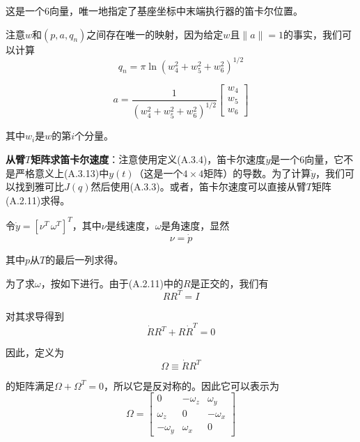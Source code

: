 \documentclass[UTF8,a4paper]{ctexart}
\begin{document}
这是一个6向量，唯一地指定了基座坐标中末端执行器的笛卡尔位置。

注意$w$和$(p, a, q_n)$之间存在唯一的映射，因为给定$w$且$\|a\|=1$的事实，我们可以计算
\begin{equation}
q_n = \pi \ln(w_4^2 + w_5^2 + w_6^2)^{1/2}
\tag{A.3.19}
\end{equation}

\begin{equation}
a = \frac{1}{(w_4^2 + w_5^2 + w_6^2)^{1/2}} \begin{bmatrix} w_4 \\ w_5 \\ w_6 \end{bmatrix}
\tag{A.3.20}
\end{equation}

其中$w_i$是$w$的第$i$个分量。

\textbf{从臂$T$矩阵求笛卡尔速度}：注意使用定义(A.3.4)，笛卡尔速度$\dot{y}$是一个6向量，它不是严格意义上(A.3.13)中$y(t)$（这是一个$4\times 4$矩阵）的导数。为了计算$\dot{y}$，我们可以找到雅可比$J(q)$然后使用(A.3.3)。或者，笛卡尔速度可以直接从臂$T$矩阵(A.2.11)求得。

令$\dot{y} = [\nu^T \, \omega^T]^T$，其中$\nu$是线速度，$\omega$是角速度，显然
\begin{equation}
\nu = \dot{p}
\tag{A.3.21}
\end{equation}

其中$p$从$T$的最后一列求得。

为了求$\omega$，按如下进行。由于(A.2.11)中的$R$是正交的，我们有
\begin{equation}
RR^T = I
\tag{A.3.22}
\end{equation}

对其求导得到
\begin{equation}
\dot{R}R^T + R\dot{R}^T = 0
\end{equation}

因此，定义为
\begin{equation}
\Omega \equiv \dot{R}R^T
\tag{A.3.23}
\end{equation}

的矩阵满足$\Omega + \Omega^T = 0$，所以它是反对称的。因此它可以表示为
\begin{equation}
\Omega = \begin{bmatrix} 0 & -\omega_z & \omega_y \\ \omega_z & 0 & -\omega_x \\ -\omega_y & \omega_x & 0 \end{bmatrix}
\tag{A.3.24}
\end{equation}
\end{document}
